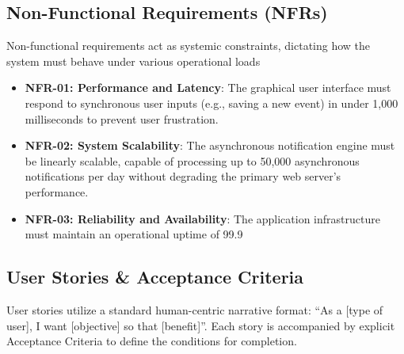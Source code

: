 \subsection{Non-Functional Requirements (NFRs)}
Non-functional requirements act as systemic constraints, dictating how the system must behave under various operational loads
\begin{itemize}[leftmargin=*]
    \item \textbf{NFR-01: Performance and Latency}: The graphical user interface must respond to synchronous user inputs (e.g., saving a new event) in under 1,000 milliseconds to prevent user frustration.


    \item \textbf{NFR-02: System Scalability}: The asynchronous notification engine must be linearly scalable, capable of processing up to 50,000 asynchronous notifications per day without degrading the primary web server's performance.


    \item \textbf{NFR-03: Reliability and Availability}: The application infrastructure must maintain an operational uptime of 99.9%
\end{itemize}
\subsection{User Stories \& Acceptance Criteria}

User stories utilize a standard human-centric narrative format: ``As a [type of user], I want [objective] so that [benefit]''. Each story is accompanied by explicit Acceptance Criteria to define the conditions for completion. %

